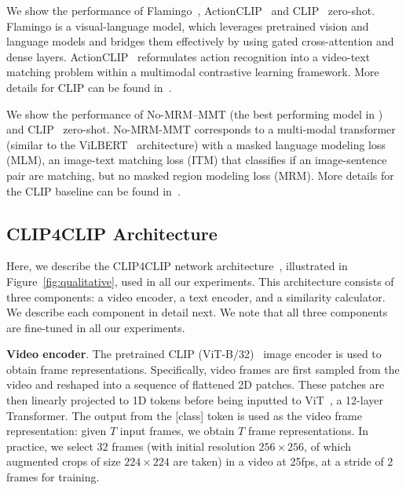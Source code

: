  We show the performance of Flamingo~\cite{flamingo}, ActionCLIP~\cite{actionclip} and CLIP~\cite{Radford2021CLIP} zero-shot. Flamingo is a visual-language model, which leverages pretrained vision and language models and bridges them effectively by using gated cross-attention and dense layers.  ActionCLIP~\cite{actionclip} reformulates action recognition into a video-text matching problem within a multimodal contrastive learning framework. More details for CLIP can be found in~\cite{Radford2021CLIP}. 


 We show the performance of No-MRM–MMT (the best performing model in \cite{hendricks2021probing}) and CLIP~\cite{Radford2021CLIP} zero-shot. No-MRM-MMT corresponds to a multi-modal transformer (similar to the ViLBERT~\cite{vilbert} architecture) with a masked language modeling loss (MLM), an image-text matching loss (ITM) that classifies if an image-sentence pair are matching, but no masked region modeling loss (MRM). More details for the CLIP baseline can be found in~\cite{Radford2021CLIP}. 



\subsection{CLIP4CLIP Architecture}\label{subsec:app:clip4clip}

Here, we describe the CLIP4CLIP network architecture~\cite{Luo2021CLIP4Clip}, illustrated in Figure~\ref{fig:qualitative}, used in all our experiments. This architecture consists of three components: a video encoder, a text encoder, and a similarity calculator. We describe each component in detail next. We note that all three components are fine-tuned in all our experiments.

\noindent \textbf{Video encoder}. The pretrained CLIP (ViT-B/32)~\cite{Radford2021CLIP} image encoder is used to obtain frame representations. Specifically, video frames are first sampled from the video and reshaped into a sequence of flattened 2D patches. These patches are then linearly projected to 1D tokens before being inputted to ViT~\cite{dosovitskiy2020vit}, a 12-layer Transformer. The output from the [class] token is used as the video frame representation: given $T$ input frames, we obtain $T$ frame representations. In practice, we select 32 frames (with initial resolution $256 \times 256$, of which augmented crops of size $224 \times 224$ are taken) in a video at 25fps, at a stride of 2 frames for training. 


